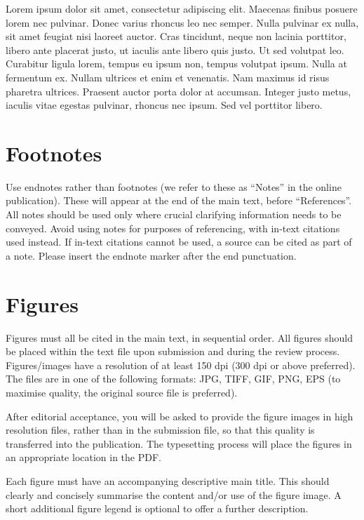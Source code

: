 \documentclass{article}
\begin{document}
Lorem ipsum dolor sit amet, consectetur adipiscing elit.
Maecenas finibus posuere lorem nec pulvinar. Donec varius rhoncus leo
nec semper. Nulla pulvinar ex nulla, sit amet feugiat nisi laoreet auctor.
Cras tincidunt, neque non lacinia porttitor, libero ante placerat justo,
ut iaculis ante libero quis justo. Ut sed volutpat leo. Curabitur ligula
lorem, tempus eu ipsum non, tempus volutpat ipsum. Nulla at fermentum ex.
Nullam ultrices et enim et venenatis. Nam maximus id risus pharetra ultrices.
Praesent auctor porta dolor at accumsan.
Integer justo metus, iaculis vitae egestas pulvinar, rhoncus nec ipsum.
Sed vel porttitor libero.

\section{Footnotes}\label{sec:footnotes}

Use endnotes rather than footnotes
(we refer to these as ``Notes'' in the online publication).
These will appear at the end of the main text, before ``References''.
All notes should be used only where crucial clarifying information
needs to be conveyed.
Avoid using notes for purposes of referencing, with in-text citations used
instead.
If in-text citations cannot be used, a source can be cited as part of a note.
Please insert the endnote marker after the end punctuation.

\section{Figures}\label{sec:figures}

Figures must all be cited in the main text, in sequential order.
All figures should be placed within the text file upon submission and during
the review process. Figures/images have a resolution of at least 150 dpi
(300 dpi or above preferred). The files are in one of the following formats:
JPG, TIFF, GIF, PNG, EPS (to maximise quality,
the original source file is preferred).

After editorial acceptance, you will be asked to provide the figure
images in high resolution files, rather than in the submission file,
so that this quality is transferred into the publication.
The typesetting process will place the figures in an appropriate
location in the PDF.

Each figure must have an accompanying descriptive main title.
This should clearly and concisely summarise the content and/or
use of the figure image.
A short additional figure legend is optional to offer a further description.
\end{document}
